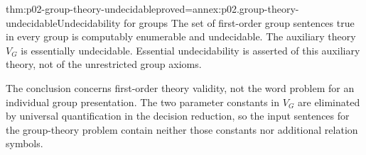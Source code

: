 \begin{hbtheorem}{thm:p02-group-theory-undecidable}{proved=annex:p02.group-theory-undecidable}{Undecidability for groups}
The set of first-order group sentences true in every group is computably
enumerable and undecidable. The auxiliary theory \(V_G\) is essentially
undecidable. Essential undecidability is asserted of this auxiliary theory,
not of the unrestricted group axioms.
\end{hbtheorem}

The conclusion concerns first-order theory validity, not the word problem
for an individual group presentation. The two parameter constants in
\(V_G\) are eliminated by universal quantification in the decision
reduction, so the input sentences for the group-theory problem contain
neither those constants nor additional relation symbols.
